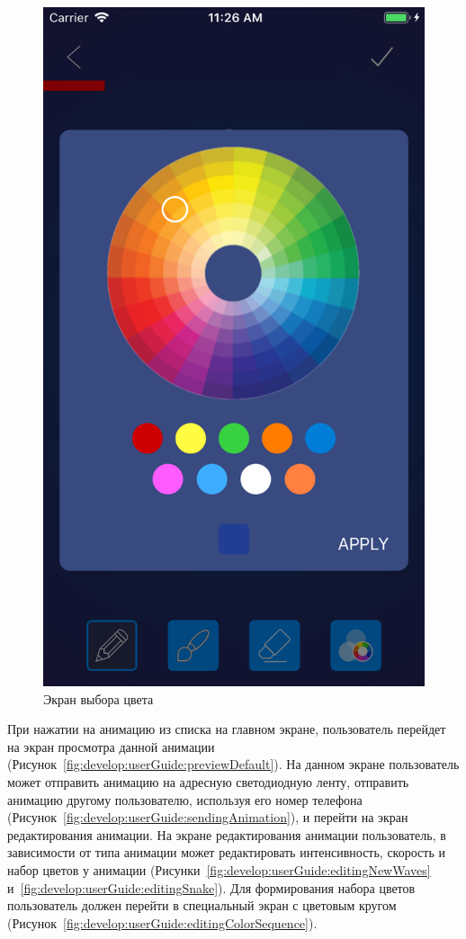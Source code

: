 \begin{figure}[H]
\centering
	\includegraphics[scale=0.2]{figures/userGuide/colorPicker.png}
	\caption{Экран выбора цвета}
	\label{fig:develop:userGuide:colorPicker}
\end{figure}

При нажатии на анимацию из списка на главном экране, пользователь перейдет на экран просмотра данной анимации (Рисунок~\ref{fig:develop:userGuide:previewDefault}). На данном экране пользователь может отправить анимацию на адресную светодиодную ленту, отправить анимацию другому пользователю, используя его номер телефона (Рисунок~\ref{fig:develop:userGuide:sendingAnimation}), и перейти на экран редактирования анимации. На экране редактирования анимации пользователь, в зависимости от типа анимации может редактировать интенсивность, скорость и набор цветов у анимации (Рисунки~\ref{fig:develop:userGuide:editingNewWaves} и~\ref{fig:develop:userGuide:editingSnake}). Для формирования набора цветов пользователь должен перейти в специальный экран с цветовым кругом (Рисунок~\ref{fig:develop:userGuide:editingColorSequence}).


